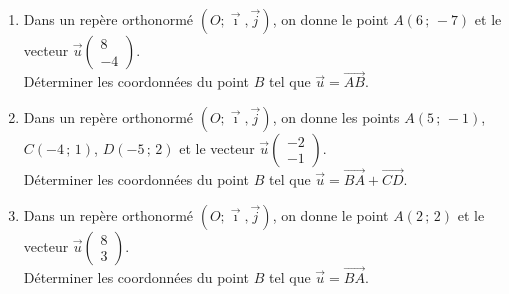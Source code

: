 {\begin{Exercice}
\begin{enumerate}[itemsep=1em]
	\item \begin{minipage}[t]{\linewidth}Dans un repère orthonormé $(O;\vec \imath, \overrightarrow{j})$, on donne le point $A(6\,;\,-7)$ et le vecteur $\overrightarrow{u}\begin{pmatrix}8\\-4\end{pmatrix}$.\\Déterminer les coordonnées du point $B$ tel que $\overrightarrow{u}=\overrightarrow{AB}$.\end{minipage}
	\item \begin{minipage}[t]{\linewidth}Dans un repère orthonormé $(O;\vec \imath, \overrightarrow{j})$, on donne les points $A(5\,;\,-1)$, $C(-4\,;\,1)$, $D(-5\,;\,2)$ et le vecteur $\overrightarrow{u}\begin{pmatrix}-2\\-1\end{pmatrix}$.\\Déterminer les coordonnées du point $B$ tel que $\overrightarrow{u}=\overrightarrow{BA}+\overrightarrow{CD}$.\end{minipage}
	\item \begin{minipage}[t]{\linewidth}Dans un repère orthonormé $(O;\vec \imath, \overrightarrow{j})$, on donne le point $A(2\,;\,2)$ et le vecteur $\overrightarrow{u}\begin{pmatrix}8\\3\end{pmatrix}$.\\Déterminer les coordonnées du point $B$ tel que $\overrightarrow{u}=\overrightarrow{BA}$.\end{minipage}
\end{enumerate}
\end{Exercice}

}
